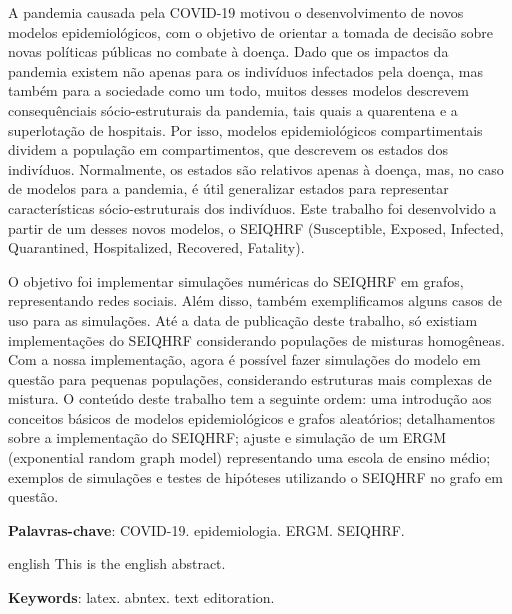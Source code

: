 \setlength{\absparsep}{18pt} %
\begin{resumo}
  A pandemia causada pela COVID-19 motivou o desenvolvimento de novos modelos 
  epidemiológicos, com o objetivo de orientar a tomada de decisão sobre novas 
  políticas públicas no combate à doença.
  Dado que os impactos da pandemia existem não apenas para os indivíduos 
  infectados pela doença, mas também para a sociedade como um todo, 
  muitos desses modelos descrevem consequênciais sócio-estruturais 
  da pandemia, tais quais a quarentena e a superlotação de hospitais.
  Por isso, modelos epidemiológicos compartimentais dividem a população em 
  compartimentos, que descrevem os estados dos indivíduos. Normalmente, os 
  estados são relativos apenas à doença, mas, no caso de modelos para a 
  pandemia, é útil generalizar estados para representar características 
  sócio-estruturais dos indivíduos.
  Este trabalho foi desenvolvido a partir de um desses novos modelos, o 
  SEIQHRF (Susceptible, Exposed, Infected, Quarantined, Hospitalized, 
  Recovered, Fatality). 

  O objetivo foi implementar simulações numéricas do SEIQHRF em grafos, 
  representando redes sociais.
  Além disso, também exemplificamos alguns casos de uso para as simulações.
  Até a data de publicação deste trabalho, só existiam implementações do 
  SEIQHRF considerando populações de misturas homogêneas. 
  Com a nossa implementação, agora é possível fazer simulações do modelo 
  em questão para pequenas populações, considerando estruturas mais complexas 
  de mistura.
  O conteúdo deste trabalho tem a seguinte ordem: 
  uma introdução aos conceitos básicos de modelos epidemiológicos e 
  grafos aleatórios; detalhamentos sobre a implementação do SEIQHRF; 
  ajuste e simulação de um ERGM (exponential random graph model) 
  representando uma escola de ensino médio; exemplos de simulações e 
  testes de hipóteses utilizando o SEIQHRF no grafo em questão.

   \vspace{\onelineskip}
 
   \noindent 
   \textbf{Palavras-chave}: COVID-19. epidemiologia. ERGM. SEIQHRF.
\end{resumo}

\begin{resumo}[Abstract]
 \begin{otherlanguage*}{english}
   This is the english abstract.

   \vspace{\onelineskip}
 
   \noindent 
   \textbf{Keywords}: latex. abntex. text editoration.
 \end{otherlanguage*}
\end{resumo}

